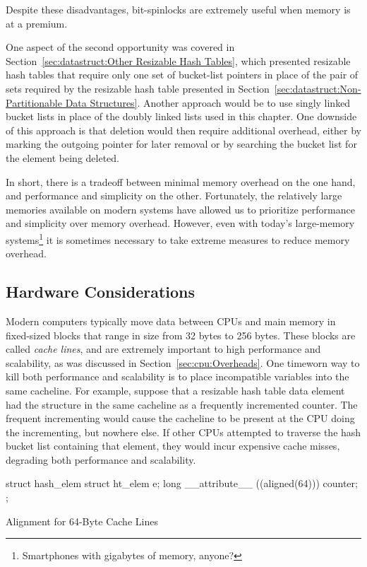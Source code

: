 Despite these disadvantages, bit-spinlocks are extremely useful when
memory is at a premium.

One aspect of the second opportunity was covered in
Section~\ref{sec:datastruct:Other Resizable Hash Tables},
which presented resizable hash tables that require only one
set of bucket-list pointers in place of the pair of sets required
by the resizable hash table presented in
Section~\ref{sec:datastruct:Non-Partitionable Data Structures}.
Another approach would be to use singly linked bucket lists in
place of the doubly linked lists used in this chapter.
One downside of this approach is that deletion would then require
additional overhead, either by marking the outgoing pointer
for later removal
or by searching the bucket list for the element being deleted.

In short, there is a tradeoff between minimal memory overhead on
the one hand, and performance and simplicity on the other.
Fortunately, the relatively large memories available on modern
systems have allowed us to prioritize performance and simplicity
over memory overhead.
However, even with today's large-memory systems\footnote{
	Smartphones with gigabytes of memory, anyone?}
it is sometimes necessary to take extreme measures to reduce
memory overhead.

\subsection{Hardware Considerations}
\label{sec:datastruct:Hardware Considerations}

Modern computers typically move data between CPUs and main memory in
fixed-sized blocks that range in size from 32 bytes to 256 bytes.
These blocks are called \emph{cache lines}, and are extremely important
to high performance and scalability, as was discussed in
Section~\ref{sec:cpu:Overheads}.
One timeworn way to kill both performance and scalability is to
place incompatible variables into the same cacheline.
For example, suppose that a resizable hash table data element had
the  structure in the same cacheline as a frequently incremented
counter.
The frequent incrementing would cause the cacheline to be present at
the CPU doing the incrementing, but nowhere else.
If other CPUs attempted to traverse the hash bucket list containing
that element, they would incur expensive cache misses, degrading both
performance and scalability.

\begin{listing}[tb]
\begin{VerbatimL}
struct hash_elem {
	struct ht_elem e;
	long __attribute__ ((aligned(64))) counter;
};
\end{VerbatimL}
\caption{Alignment for 64-Byte Cache Lines}
\label{lst:datastruct:Alignment for 64-Byte Cache Lines}
\end{listing}

